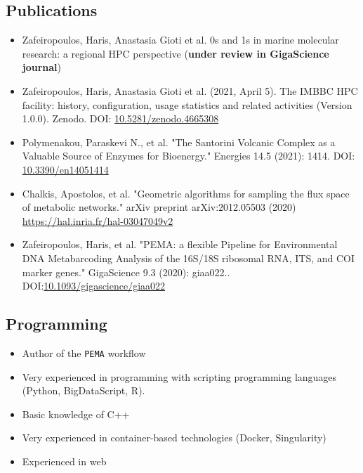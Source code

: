 \documentclass{article}
\begin{document}
\subsection{Publications}

\begin{itemize}

   \item Zafeiropoulos, Haris, Anastasia Gioti et al. 0s and 1s in marine molecular research: a regional HPC perspective (\textbf{under review in GigaScience journal})

   \item Zafeiropoulos, Haris, Anastasia Gioti et al. (2021, April 5). The IMBBC HPC facility: history, configuration, usage statistics and related activities (Version 1.0.0). Zenodo. DOI: \href{http://doi.org/10.5281/zenodo.4665308}{10.5281/zenodo.4665308}

   \item Polymenakou, Paraskevi N., et al. "The Santorini Volcanic Complex as a Valuable Source of Enzymes for Bioenergy." Energies 14.5 (2021): 1414. DOI: \href{https://doi.org/10.3390/en14051414}{10.3390/en14051414}
   
   \item Chalkis, Apostolos, et al. "Geometric algorithms for sampling the flux space of metabolic networks." arXiv preprint arXiv:2012.05503 (2020) \href{https://hal.inria.fr/hal-03047049v2}{https://hal.inria.fr/hal-03047049v2}
   
   \item Zafeiropoulos, Haris, et al. "PEMA: a flexible Pipeline for Environmental DNA Metabarcoding Analysis of the 16S/18S ribosomal RNA, ITS, and COI marker genes." GigaScience 9.3 (2020): giaa022.. 
   DOI:\href{https://doi.org/10.1093/gigascience/giaa022}{10.1093/gigascience/giaa022}
   
\end{itemize}


\subsection{Programming}

\begin{itemize}
   \item Author of the \texttt{PEMA} workflow
   \item Very experienced in programming with scripting programming languages \\
   (Python, BigDataScript, R).
   \item Basic knowledge of C++
   \item Very experienced in container-based technologies (Docker, Singularity)
   \item Experienced in web 
\end{itemize}
\end{document}
